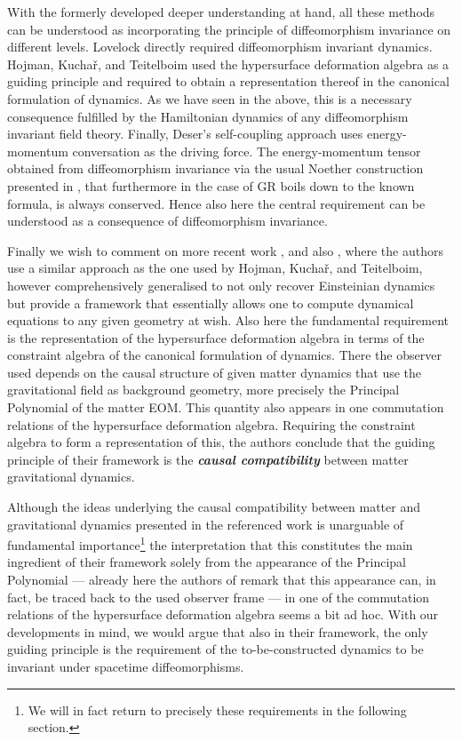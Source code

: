 \documentclass[a4paper,12pt, DIV=14, BCOR=5mm, twoside, headsepline, numbers=noenddot]{scrbook}
\begin{document}
With the formerly developed deeper understanding at hand, all these methods can be understood as incorporating the principle of diffeomorphism invariance on different levels. Lovelock directly required diffeomorphism invariant dynamics. Hojman, Kuchař, and Teitelboim used the hypersurface deformation algebra as a guiding principle and required to obtain a representation thereof in the canonical formulation of dynamics. As we have seen in the above, this is a necessary consequence fulfilled by the Hamiltonian dynamics of any diffeomorphism invariant field theory. Finally, Deser's self-coupling approach uses energy-momentum conversation as the driving force. The energy-momentum tensor obtained from diffeomorphism invariance via the usual Noether construction presented in \cite{Gotay1992StressEnergyMomentumTA}, that furthermore in the case of GR boils down to the known formula, is always conserved. Hence also here the central requirement can be understood as a consequence of diffeomorphism invariance. 

Finally we wish to comment on more recent work \cite{2018PhRvD..97h4036D}, \cite{2012PhRvD..85j4042G} and also \cite{2017arXiv170803870S}, where the authors use a similar approach as the one used by Hojman, Kuchař, and Teitelboim, however comprehensively generalised to not only recover Einsteinian dynamics but provide a framework that essentially allows one to compute dynamical equations to any given geometry at wish. Also here the fundamental requirement is the representation of the hypersurface deformation algebra in terms of the constraint algebra of the canonical formulation of dynamics. There the observer used depends on the causal structure of given matter dynamics that use the gravitational field as background geometry, more precisely the Principal Polynomial of the matter EOM. This quantity also appears in one commutation relations of the hypersurface deformation algebra. Requiring the constraint algebra to form a representation of this, the authors conclude that the guiding principle of their framework is the \textit{\textbf{causal compatibility}} between matter gravitational dynamics.

Although the ideas underlying the causal compatibility between matter and gravitational dynamics presented in the referenced work is unarguable of fundamental importance\footnote{We will in fact return to precisely these requirements in the following section.} the interpretation that this constitutes the main ingredient of their framework solely from the appearance of the Principal Polynomial --- already here the authors of \cite{2018PhRvD..97h4036D} remark that this appearance can, in fact, be traced back to the used observer frame --- in one of the commutation relations of the hypersurface deformation algebra seems a bit ad hoc.
With our developments in mind, we would argue that also in their framework, the only guiding principle is the requirement of the to-be-constructed dynamics to be invariant under spacetime diffeomorphisms.
\end{document}
